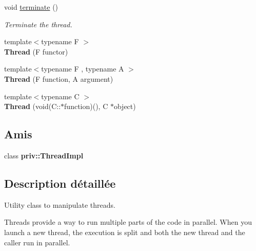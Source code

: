 \begin{DoxyCompactItemize}
void \hyperlink{classsf_1_1Thread_ad6b205d4f1ce38b8d44bba0f5501477c}{terminate} ()
\begin{DoxyCompactList}\small\item\em Terminate the thread. \end{DoxyCompactList}\item 
\mbox{\label{classsf_1_1Thread_a00b88f036de66eb63765f4c12ceb6870}} 
{\footnotesize template$<$typename F $>$ }\\{\bfseries Thread} (F functor)
\item 
\mbox{\label{classsf_1_1Thread_a719b2cc067d92d52c35064a49d850a53}} 
{\footnotesize template$<$typename F , typename A $>$ }\\{\bfseries Thread} (F function, A argument)
\item 
\mbox{\label{classsf_1_1Thread_aa9f473c8cbb078900c62b1fd14a83a34}} 
{\footnotesize template$<$typename C $>$ }\\{\bfseries Thread} (void(C\+::$\ast$function)(), C $\ast$object)
\end{DoxyCompactItemize}
\subsection*{Amis}
\begin{DoxyCompactItemize}
\item 
\mbox{\label{classsf_1_1Thread_a5ed4f3acfcb44de47de196437c39f9ef}} 
class {\bfseries priv\+::\+Thread\+Impl}
\end{DoxyCompactItemize}


\subsection{Description détaillée}
Utility class to manipulate threads. 

Threads provide a way to run multiple parts of the code in parallel. When you launch a new thread, the execution is split and both the new thread and the caller run in parallel.

